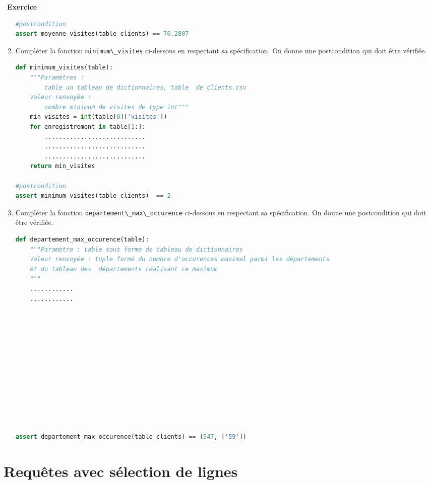 \documentclass[
  11pt,
]{article}
\newcommand{\passthrough}[1]{#1}
\newcounter{exo}
\newenvironment{exercice}[1]
{\par \medskip   \addtocounter{exo}{1} \noindent  
\begin{bclogo}[arrondi =0.1,   noborder = true, logo=\bccrayon, marge=4]{~\textbf{Exercice} \textbf{\theexo} {\itshape #1} }  \par}
{
\end{bclogo}
 \par \bigskip }
\newcounter{def}
\begin{document}
\begin{exercice}{}
\begin{enumerate}
\begin{lstlisting}[language=Python]
#postcondition
assert moyenne_visites(table_clients) == 76.2807 
\end{lstlisting}
\item
  Compléter la fonction \passthrough{\lstinline!minimum\_visites!}
  ci-dessous en respectant sa spécification. On donne une postcondition
  qui doit être vérifiée.

\begin{lstlisting}[language=Python]
def minimum_visites(table):
    """Paramètres : 
        table un tableau de dictionnaires, table  de clients.csv
    Valeur renvoyée :
        nombre minimum de visites de type int"""    
    min_visites = int(table[0]['visites'])
    for enregistrement in table[1:]:
        ............................
        ............................
        ............................
    return min_visites

#postcondition
assert minimum_visites(table_clients)  == 2
\end{lstlisting}
\item
  Compléter la fonction
  \passthrough{\lstinline!departement\_max\_occurence!} ci-dessous en
  respectant sa spécification. On donne une postcondition qui doit être
  vérifiée.

\begin{lstlisting}[language=Python]
def departement_max_occurence(table):
    """Paramètre : table sous forme de tableau de dictionnaires
    Valeur renvoyée : tuple formé du nombre d'occurences maximal parmi les départements
    et du tableau des  départements réalisant ce maximum
    """
    ............
    ............ 













assert departement_max_occurence(table_clients) == (547, ['59'])
\end{lstlisting}
\end{enumerate}

\end{exercice}

\hypertarget{requuxeates-avec-suxe9lection-de-lignes}{%
\section{Requêtes avec sélection de
lignes}\label{requuxeates-avec-suxe9lection-de-lignes}}
\end{document}
